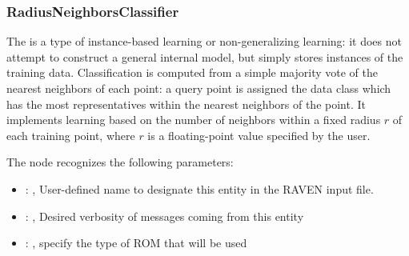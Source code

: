 \subsubsection{RadiusNeighborsClassifier}
  The  is a type of instance-based learning or
  non-generalizing learning: it does not attempt to construct a general internal
  model, but simply stores instances of the training data.                          Classification
  is computed from a simple majority vote of the nearest neighbors                          of each
  point: a query point is assigned the data class which has the most
  representatives within the nearest neighbors of the point.                          It implements
  learning based on the number of neighbors within a fixed radius                          $r$ of
  each training point, where $r$ is a floating-point value specified by the
  user.                          

  The  node recognizes the following parameters:
    \begin{itemize}
      \item {}: , 
        User-defined name to designate this entity in the RAVEN input file.
      \item {}: , 
        Desired verbosity of messages coming from this entity
      \item {}: , 
        specify the type of ROM that will be used
  \end{itemize}

